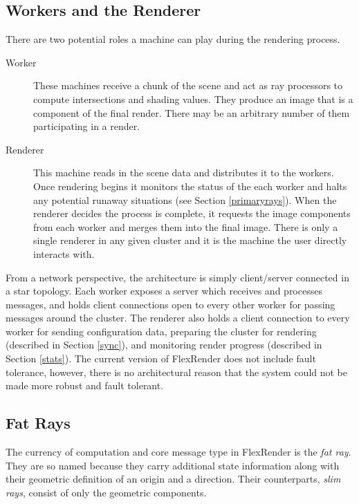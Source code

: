 \documentclass[a4paper,twoside]{article}
\begin{document}
\subsection{Workers and the Renderer}
\label{workers}

There are two potential roles a machine can play during the rendering process.

\begin{description}
    \item[Worker] These machines receive a chunk of the scene and act as ray
        processors to compute intersections and shading values. They produce
        an image that is a component of the final render. There may be an
        arbitrary number of them participating in a render.
    \item[Renderer] This machine reads in the scene data and distributes it to
        the workers. Once rendering begins it monitors the status of the each
        worker and halts any potential runaway situations (see Section \ref{primaryrays}).
        When the renderer decides the process is complete, it requests
        the image components from each worker and merges them into the final
        image. There is only a single renderer in any given cluster and it is
        the machine the user directly interacts with.
\end{description}

From a network perspective, the architecture is simply client/server connected
in a star topology. Each worker exposes a server which receives and
processes messages, and holds client connections open to every other worker for
passing messages around the cluster. The renderer also holds a client connection
to every worker for sending configuration data, preparing the cluster for rendering
(described in Section \ref{sync}), and monitoring render progress (described in
Section \ref{stats}).  The current version of FlexRender does not include fault tolerance,
however, there is no architectural reason that the system could not be made
more robust and fault tolerant. 

\subsection{Fat Rays}
\label{fatrays}

The currency of computation and core message type in FlexRender is the
\emph{fat ray}. They are so named because they carry additional state
information along with their geometric definition of an origin and a direction.
Their counterparts, \emph{slim rays}, consist of only the geometric components.
\end{document}

